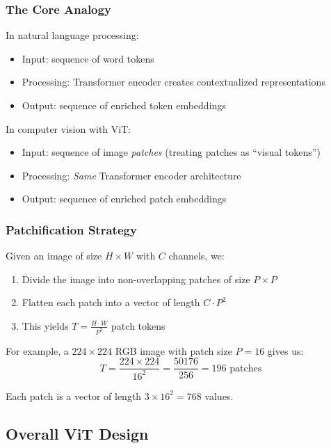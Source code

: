 \documentclass{article}
\begin{document}
\subsubsection{The Core Analogy}

In natural language processing:
\begin{itemize}
\item Input: sequence of word tokens
\item Processing: Transformer encoder creates contextualized representations
\item Output: sequence of enriched token embeddings
\end{itemize}

In computer vision with ViT:
\begin{itemize}
\item Input: sequence of image \textit{patches} (treating patches as ``visual tokens'')
\item Processing: \textit{Same} Transformer encoder architecture
\item Output: sequence of enriched patch embeddings
\end{itemize}

\subsubsection{Patchification Strategy}

Given an image of size $H \times W$ with $C$ channels, we:

\begin{enumerate}
\item Divide the image into non-overlapping patches of size $P \times P$
\item Flatten each patch into a vector of length $C \cdot P^2$
\item This yields $T = \frac{H \cdot W}{P^2}$ patch tokens
\end{enumerate}

For example, a $224 \times 224$ RGB image with patch size $P=16$ gives us:
\begin{equation}
T = \frac{224 \times 224}{16^2} = \frac{50176}{256} = 196 \text{ patches}
\end{equation}

Each patch is a vector of length $3 \times 16^2 = 768$ values.

\subsection{Overall ViT Design}
\end{document}
